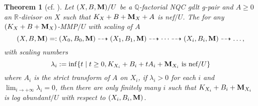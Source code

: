 \documentclass[11pt]{amsart}
\numberwithin{equation}{section}
\newcommand{\Mm}{{\bf{M}}}
\newcommand{\Qq}{\mathbb{Q}}
\newtheorem{thm}{Theorem}[section]
\theoremstyle{definition}
\theoremstyle{definition}
\theoremstyle{definition}
\begin{document}
\begin{thm}[{cf. \cite[Theorem 3.15]{Has22}}]\label{thm: has22 3.15 rel ver}
Let $(X,B,\Mm)/U$ be a $\Qq$-factorial NQC gdlt g-pair and $A\geq 0$ an $\mathbb{R}$-divisor on $X$ such that $K_{X}+B+\Mm_{X}+A$ is nef$/U$. The for any $(K_{X}+B+\Mm_{X})$-MMP$/U$ with scaling of $A$
$$(X,B, \Mm)=:(X_{0},B_{0},\Mm) \dashrightarrow (X_{1}, B_{1},\Mm) \dashrightarrow \dots \dashrightarrow (X_{i}, B_{i},\Mm) \dashrightarrow \dots,$$
with scaling numbers
$$\lambda_i:=\inf\{t\mid t\geq 0, K_{X_i}+B_i+tA_i+\Mm_{X_i}\text{ is nef}/U\}$$
where $A_i$ is the strict transform of $A$ on $X_i$, if $\lambda_i>0$ for each $i$ and $\lim_{i\rightarrow+\infty}\lambda_i=0$, then there are only finitely many $i$ such that $K_{X_i}+B_i+\Mm_{X_i}$ is log abundant$/U$ with respect to $(X_i,B_i,\Mm)$.
\end{thm}
\end{document}
